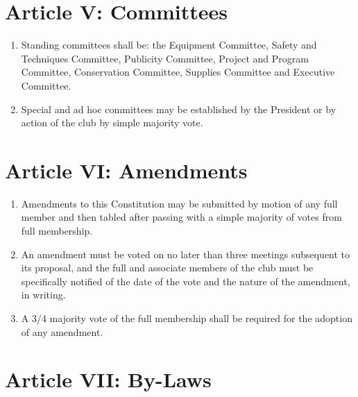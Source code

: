 \documentclass[
]{article}
\providecommand{\tightlist}{%
  \setlength{\itemsep}{0pt}\setlength{\parskip}{0pt}}
\begin{document}
\hypertarget{article-v-committees}{%
\section{Article V: Committees}\label{article-v-committees}}

\begin{enumerate}
\def\labelenumi{\arabic{enumi}.}
\tightlist
\item
  Standing committees shall be: the Equipment Committee, Safety and
  Techniques Committee, Publicity Committee, Project and Program
  Committee, Conservation Committee, Supplies Committee and Executive
  Committee.
\item
  Special and ad hoc committees may be established by the President or
  by action of the club by simple majority vote.
\end{enumerate}

\hypertarget{article-vi-amendments}{%
\section{Article VI: Amendments}\label{article-vi-amendments}}

\begin{enumerate}
\def\labelenumi{\arabic{enumi}.}
\tightlist
\item
  Amendments to this Constitution may be submitted by motion of any full
  member and then tabled after passing with a simple majority of votes
  from full membership.
\item
  An amendment must be voted on no later than three meetings subsequent
  to its proposal, and the full and associate members of the club must
  be specifically notified of the date of the vote and the nature of the
  amendment, in writing.
\item
  A 3/4 majority vote of the full membership shall be required for the
  adoption of any amendment.
\end{enumerate}

\hypertarget{article-vii-by-laws}{%
\section{Article VII: By-Laws}\label{article-vii-by-laws}}
\end{document}
